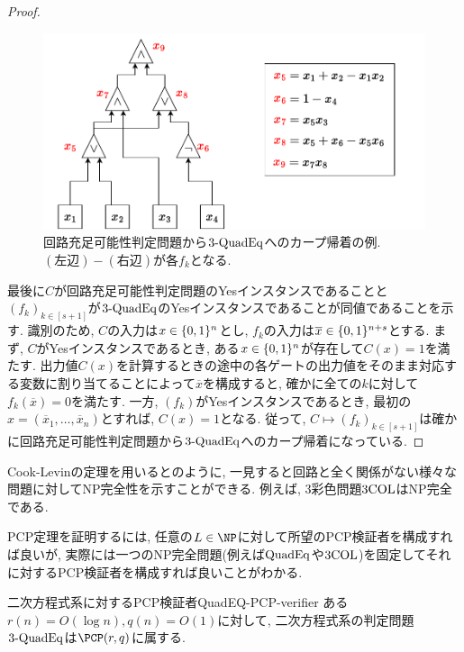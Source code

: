 \begin{proof}
  \begin{figure}[ht]
    \centering
    \includegraphics[width=\textwidth]{images/circuit_to_3-QUADEQ.pdf}
    \caption{回路充足可能性判定問題から$\text{3-QuadEq}$へのカープ帰着の例. $(\text{左辺})-(\text{右辺})$が各$f_k$となる. \label{fig:circuit-to-3-QUADEQ}}
  \end{figure}

  最後に$C$が回路充足可能性判定問題のYesインスタンスであることと$(f_k)_{k\in[s+1]}$が$\text{3-QuadEq}$のYesインスタンスであることが同値であることを示す.
  識別のため, $C$の入力は$x\in\{0,1\}^n$とし, $f_k$の入力は$\overline{x} \in \{0,1\}^{n+s}$とする.
  まず, $C$がYesインスタンスであるとき, ある$x\in\{0,1\}^n$が存在して$C(x)=1$を満たす.
  出力値$C(x)$を計算するときの途中の各ゲートの出力値をそのまま対応する変数に割り当てることによって$\overline{x}$を構成すると, 確かに全ての$k$に対して$f_k(\overline{x})=0$を満たす.
  一方, $(f_k)$がYesインスタンスであるとき, 最初の$x=(\overline{x}_1,\dots,\overline{x}_{n})$とすれば, $C(x)=1$となる.
  従って, $C\mapsto (f_k)_{k\in[s+1]}$は確かに回路充足可能性判定問題から$\text{3-QuadEq}$へのカープ帰着になっている.
\end{proof}

Cook-Levinの定理を用いると\cite{Karp1972}のように, 一見すると回路と全く関係がない様々な問題に対してNP完全性を示すことができる.
例えば, 3彩色問題$\text{3COL}$はNP完全である.

PCP定理を証明するには, 任意の$L\in\NP$に対して所望のPCP検証者を構成すれば良いが,
実際には一つのNP完全問題(例えば$\text{QuadEq}$や$\text{3COL}$)を固定してそれに対するPCP検証者を構成すれば良いことがわかる.

\begin{theorem}{二次方程式系に対するPCP検証者}{QuadEQ-PCP-verifier}
  ある$r(n)=O(\log n),q(n)=O(1)$に対して, 二次方程式系の判定問題$\text{3-QuadEq}$は$\PCP(r,q)$に属する.
\end{theorem}

